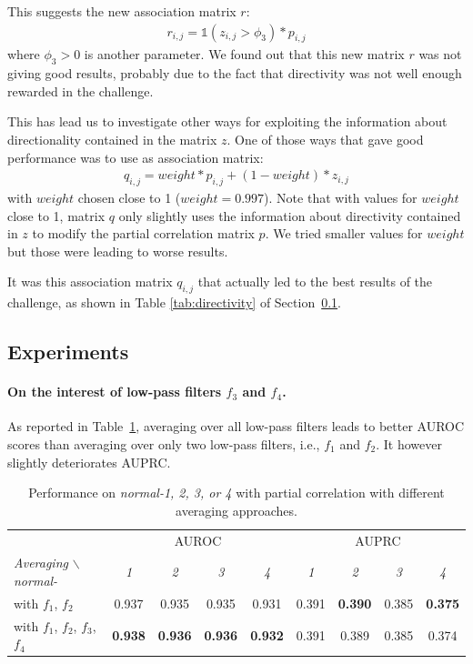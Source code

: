 \documentclass[wcp]{jmlr}
\begin{document}
This suggests the new association matrix $r$:
\begin{align}
r_{i,j} =  \mathbb{1}(z_{i,j} > \phi_3)  *  p_{i,j}
\end{align}
where $\phi_3 >0$ is another parameter. We found out that this new
matrix $r$ was not giving good results, probably due to the fact that
directivity was not well enough rewarded in the challenge.

This has lead us to investigate other ways for exploiting the
information about directionality contained in the matrix $z$. One of
those ways that gave good performance was to use as association
matrix:
\begin{align}
q_{i,j} = weight * p_{i,j} + (1-weight) * z_{i,j}
\label{eqn:qij}
\end{align}
with  $weight$ chosen close to 1 ($weight=0.997$). Note that with
values for $weight$ close to 1,   matrix $q$ only slightly uses the
information about directivity contained in $z$ to modify the  partial
correlation matrix $p$. We tried smaller values for $weight$ but those
were leading to worse results.

It was  this association matrix $q_{i,j}$ that actually led to the
best results of the challenge, as shown in Table \ref{tab:directivity}
of Section~\ref{sapp:results}.

\subsection{Experiments}
\label{sapp:results}

\paragraph{On the interest of low-pass filters $f_3$ and $f_4$.}

As reported in Table~\ref{tab:f3f4}, averaging over all low-pass filters leads
to better AUROC scores than averaging over only two low-pass filters, i.e., $f_1$ and
$f_2$. It however slightly deteriorates AUPRC.

\begin{table}[ht]
\caption{Performance on \textit{normal-1, 2, 3, or 4} with partial correlation with different averaging approaches.}
\label{tab:f3f4}
\centering
\small
\begin{tabular}{| l | c c c c | c c c c |}
\hline
& \multicolumn{4}{c|}{AUROC} & \multicolumn{4}{c|}{AUPRC} \\
\textit{Averaging} $\backslash$ \textit{normal-} & \textit{1} & \textit{2} & \textit{3} & \textit{4} & \textit{1} & \textit{2} & \textit{3} & \textit{4} \\
\hline
\hline
 with $f_1$, $f_2$ & 0.937 & 0.935 & 0.935 & 0.931 & 0.391 &  \textbf{0.390} &  0.385 & \textbf{0.375}  \\
 with $f_1$, $f_2$, $f_3$, $f_4$ & \textbf{0.938} & \textbf{0.936} & \textbf{0.936} & \textbf{0.932} & 0.391 & 0.389 & 0.385 & 0.374\\
\hline
\end{tabular}
\end{table}
\end{document}
